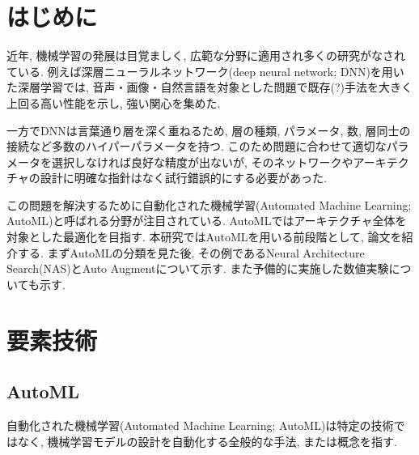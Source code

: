 \documentclass[twocolumn]{jarticle}     %
\begin{document}




\section{はじめに}

近年, 機械学習の発展は目覚ましく, 広範な分野に適用され多くの研究がなされている.
例えば深層ニューラルネットワーク(deep neural network; DNN)を用いた深層学習では, 音声・画像・自然言語を対象とした問題で既存(?)手法を大きく上回る高い性能を示し, 強い関心を集めた.

一方でDNNは言葉通り層を深く重ねるため, 層の種類, パラメータ, 数, 層同士の接続など多数のハイパーパラメータを持つ.
このため問題に合わせて適切なパラメータを選択しなければ良好な精度が出ないが, そのネットワークやアーキテクチャの設計に明確な指針はなく試行錯誤的にする必要があった.

この問題を解決するために自動化された機械学習(Automated Machine Learning; AutoML)と呼ばれる分野が注目されている. AutoMLではアーキテクチャ全体を対象とした最適化を目指す.
本研究ではAutoMLを用いる前段階として, 論文を紹介する. まずAutoMLの分類を見た後, その例であるNeural Architecture Search(NAS)とAuto Augmentについて示す.
また予備的に実施した数値実験についても示す.

\section{要素技術}
\subsection{AutoML}
自動化された機械学習(Automated Machine Learning; AutoML)\cite{SurveyAutoML}は特定の技術ではなく, 機械学習モデルの設計を自動化する全般的な手法, または概念を指す.
\end{document}

